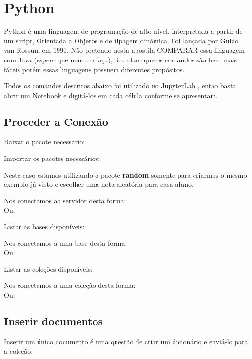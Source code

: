 \section{Python}
Python é uma linguagem de programação de alto nível, interpretada a partir de um script, Orientada a Objetos e de tipagem dinâmica. Foi lançada por Guido van Rossum em 1991. Não pretendo nesta apostila COMPARAR essa linguagem com Java (espero que nunca o faça), fica claro que os comandos são bem mais fáceis porém essas linguagens possuem diferentes propósitos.

Todos os comandos descritos abaixo foi utilizado no JupyterLab \cite{jupyteroficial}, então basta abrir um Notebook e digitá-los em cada célula conforme se apresentam.

\subsection{Proceder a Conexão}
Baixar o pacote necessário: \\

Importar os pacotes necessários: \\

Neste caso estamos utilizando o pacote \textbf{random} somente para criarmos o mesmo exemplo já visto e escolher uma nota aleatória para casa aluno.

Nos conectamos ao servidor desta forma: \\
Ou: \\

Listar as bases disponíveis: \\

Nos conectamos a uma base desta forma: \\
Ou: \\

Listar as coleções disponíveis: \\

Nos conectamos a uma coleção desta forma: \\
Ou: \\

\subsection{Inserir documentos}
Inserir um único documento é uma questão de criar um dicionário e enviá-lo para a coleção: \\

